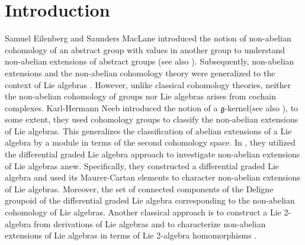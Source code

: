 \documentclass[12pt]{amsart}
\newcommand{\g}{\mathfrak g}
\begin{document}
\section{Introduction}
Samuel Eilenberg and Saunders MacLane \cite{EM} introduced the notion of non-abelian cohomology of an abstract
group with values in another group to understand non-abelian extensions of abstract groups (see also \cite{HS, Ne1}). Subsequently, non-abelian extensions and the non-abelian cohomology theory were generalized to the context of Lie algebras \cite{Alekseevsky1, Alekseevsky2, Fi, Fr, IK, Ne}. However, unlike classical cohomology theories, neither the non-abelian cohomology of groups nor Lie algebras arises from cochain complexes. Karl-Hermann Neeb \cite{Ne} introduced the notion of a $\g$-kernel(see also \cite{HN, Ho, MM}), to some extent, they used cohomology groups to classify the non-abelian extensions of Lie algebras. This generalizes the classification of abelian extensions of a Lie algebra by a module in terms of the second cohomology space. In \cite{Fr, Nr}, they utilized the differential graded Lie algebra approach to investigate non-abelian extensions of Lie algebras anew. Specifically, they constructed a differential graded Lie algebra and used its Maurer-Cartan elements to character non-abelian extensions of Lie algebras. Moreover, the set of connected components of the Deligne groupoid of the differential graded Lie algebra corresponding to the non-abelian cohomology of Lie algebras. Another classical approach is to construct a Lie 2-algebra from derivations of Lie algebras
and to characterize non-abelian extensions of Lie algebras in terms of Lie 2-algebra homomorphisms \cite{Alekseevsky1, Alekseevsky2, IK, SZ}.
\end{document}
